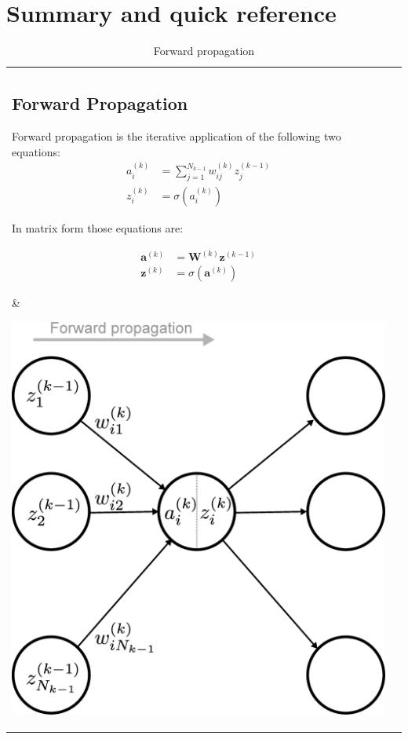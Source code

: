 \documentclass{article}
\begin{document}
\nocite{*}

{}


\clearpage
\section{Summary and quick reference}
\begin{table}[htb!]
\begin{tabular}{ll}
\parbox[b][0.4\textheight][t]{0.47\textwidth}{
\subsection{Forward Propagation}
    Forward propagation is the iterative application of the following two equations:
        \begin{align*}
            a_i^{(k)} &= \sum_{j=1}^{N_{k-1}} w_{ij}^{(k)} z_j^{(k-1)} \\
            z_i^{(k)} &= \sigma(a_i^{(k)})
        \end{align*}
        
        In matrix form those equations are:
        
        \begin{align*}
            \mathbf{a}^{(k)} &= \mathbf{W}^{(k)} \mathbf{z}^{(k-1)} \\
            \mathbf{z}^{(k)} &= \sigma(\mathbf{a}^{(k)})
        \end{align*}
} &
\parbox[b][0.4\textheight][t]{0.47\textwidth}{
        \centering
        \includegraphics[width=\linewidth]{./neural_networks_local_forward_propagation.eps}
        \caption{Forward propagation}
        \label{fig:fp}
}
\\
\parbox[b][0.4\textheight][t]{0.47\textwidth}{
}
\end{tabular}
\end{table}
\end{document}
